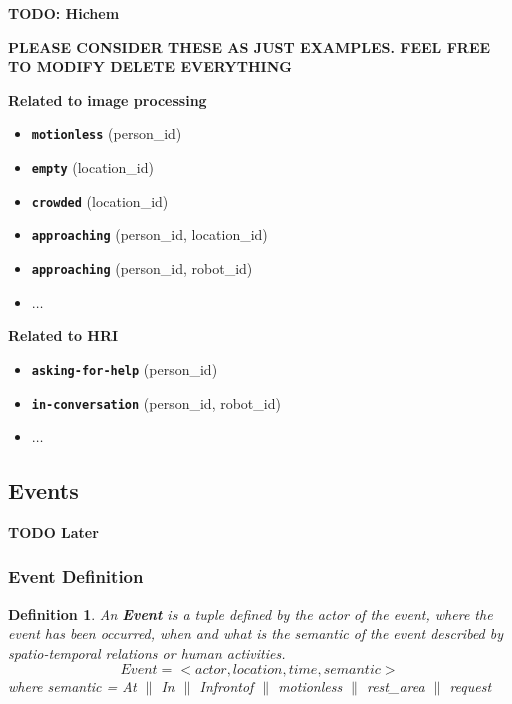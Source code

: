 \documentclass{article}
\newtheorem{defn}{Definition}
\begin{document}
{\bf TODO: Hichem}

{\bf PLEASE CONSIDER THESE AS JUST EXAMPLES. FEEL FREE TO MODIFY DELETE EVERYTHING}

{\bf Related to image processing}

\begin{itemize}

\item {\tt\bf motionless} (person\_id)
\item {\tt\bf empty} (location\_id)
\item {\tt\bf crowded} (location\_id)
\item {\tt\bf approaching} (person\_id, location\_id)
\item {\tt\bf approaching} (person\_id, robot\_id)
\item $\ldots$


\end{itemize}



{\bf Related to HRI}


\begin{itemize}

\item {\tt\bf asking-for-help} (person\_id)
\item {\tt\bf in-conversation} (person\_id, robot\_id)
\item $\ldots$

\end{itemize}


\vspace{3cm}



\subsection{Events}

{\bf TODO Later}


\subsubsection{Event Definition}
  \begin{defn}
  An {\bf Event} is a tuple defined by the actor of the event, where the event has been occurred, when and what is the semantic of the event described by spatio-temporal relations or human activities. 
  \[ Event = <actor, location, time, semantic> \] 
  where semantic = At $\|$ In $\|$ Infrontof $\|$ motionless $\|$ rest\_area $\|$ request \\
  \end{defn}
\end{document}

